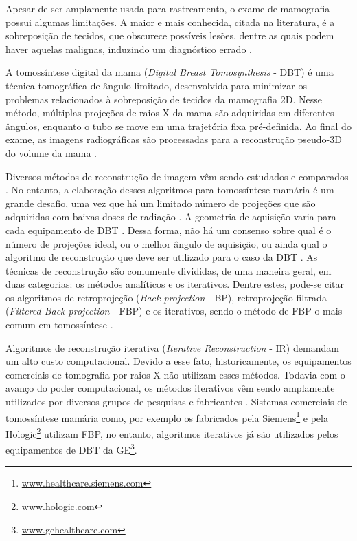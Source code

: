 Apesar de ser amplamente usada para rastreamento, o exame de mamografia possui algumas limitações. A maior e mais conhecida, citada na literatura, é a sobreposição de tecidos, que obscurece possíveis lesões, dentre as quais podem haver aquelas malignas, induzindo um diagnóstico errado \cite{vedantham2015digital}. 

A tomossíntese digital da mama (\textit{Digital Breast Tomosynthesis} - \acs{DBT}) é uma técnica tomográfica de ângulo limitado, desenvolvida para minimizar os problemas relacionados à sobreposição de tecidos da mamografia \acs{2D}. Nesse método, múltiplas projeções de raios X da mama são adquiridas em diferentes ângulos, enquanto o tubo se move em uma trajetória fixa pré-definida. Ao final do exame, as imagens radiográficas são processadas para a reconstrução pseudo-\acs{3D} do volume da mama \cite{vedantham2015digital}.  

Diversos métodos de reconstrução de imagem vêm sendo estudados e comparados \cite{wu2004comparison,zhang2006comparative}. No entanto, a elaboração desses algoritmos para tomossíntese mamária é um grande desafio, uma vez que há um limitado número de projeções que são adquiridas com baixas doses de radiação \cite{wu2004comparison}. A geometria de aquisição varia para cada equipamento de \acs{DBT} \cite{vedantham2015digital}. Dessa forma, não há um consenso sobre qual é o número de projeções ideal, ou o melhor ângulo de aquisição, ou ainda qual o algoritmo de reconstrução que deve ser utilizado para o caso da \acs{DBT} \cite{sechopoulos2009optimization}. As técnicas de reconstrução são comumente divididas, de uma maneira geral, em duas categorias: os métodos analíticos e os iterativos. Dentre estes, pode-se citar os algoritmos de retroprojeção (\textit{Back-projection} - \acs{BP}), retroprojeção filtrada (\textit{Filtered Back-projection} - \acs{FBP}) e os iterativos, sendo o método de \acs{FBP} o mais comum em tomossíntese \cite{michell2018role}.  

Algoritmos de reconstrução iterativa (\textit{Iterative Reconstruction} - \acs{IR}) demandam um alto custo computacional. Devido a esse fato, historicamente, os equipamentos comerciais de tomografia por raios X não utilizam esses métodos. Todavia com o avanço do poder computacional, os métodos iterativos vêm sendo  amplamente utilizados por diversos grupos de pesquisas e fabricantes \cite{wu2003tomographic}. Sistemas comerciais de tomossíntese mamária como, por exemplo os fabricados pela Siemens\footnote{\url{www.healthcare.siemens.com}} e pela Hologic\footnote{\url{www.hologic.com}} utilizam \acs{FBP}, no entanto, algoritmos iterativos já são utilizados pelos equipamentos de \acs{DBT} da \ac{GE}\footnote{\url{www.gehealthcare.com}}. 

